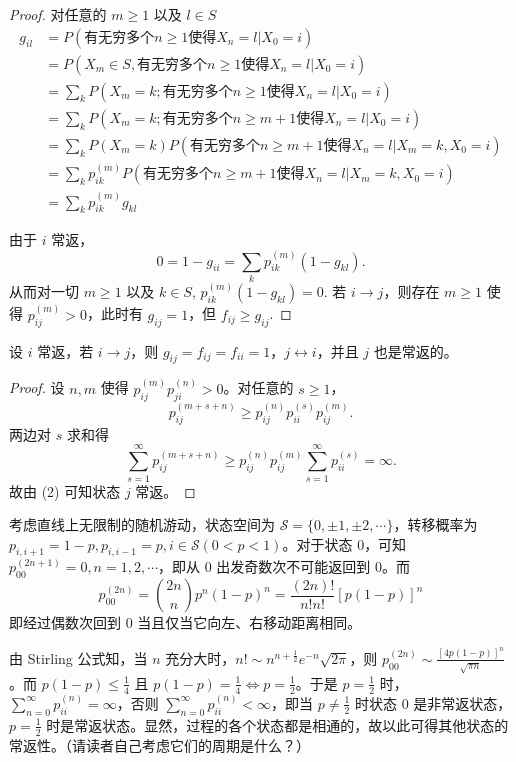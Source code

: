 \documentclass[lang=cn,10pt,thmcnt=section]{elegantbook}
\begin{document}
\begin{proof}
	对任意的 $m \geq 1$ 以及 $l \in S$
\begin{align*}
g_{il} &= P(\text{有无穷多个} n \geq 1 \text{使得} X_n = l | X_0 = i) \\
&= P(X_m \in S, \text{有无穷多个} n \geq 1 \text{使得} X_n = l | X_0 = i) \\
&= \sum_k P(X_m = k; \text{有无穷多个} n \geq 1 \text{使得} X_n = l | X_0 = i) \\
&= \sum_k P(X_m = k; \text{有无穷多个} n \geq m+1 \text{使得} X_n = l | X_0 = i) \\
&= \sum_k P(X_m = k) P(\text{有无穷多个} n \geq m+1 \text{使得} X_n = l | X_m = k, X_0 = i) \\
&= \sum_k p_{ik}^{(m)} P(\text{有无穷多个} n \geq m+1 \text{使得} X_n = l | X_m = k, X_0 = i) \\
&= \sum_k p_{ik}^{(m)} g_{kl}
\end{align*}

由于 $i$ 常返，
\[
0 = 1 - g_{ii} = \sum_k p_{ik}^{(m)} (1 - g_{kl}).
\]
从而对一切 $m \geq 1$ 以及 $k \in S$, $p_{ik}^{(m)} (1 - g_{kl}) = 0$.
若 $i \rightarrow j$，则存在 $m \geq 1$ 使得 $p_{ij}^{(m)} > 0$，此时有 $g_{ij} = 1$，但 $f_{ij} \geq g_{ij}$.

\end{proof}
\begin{theorem}
	设 $i$ 常返，若 $i \rightarrow j$，则 $g_{ij} = f_{ij} = f_{ii} = 1$，$j \leftrightarrow i$，并且 $j$ 也是常返的。
\end{theorem}
\begin{proof}
	设 $n, m$ 使得 $p_{ij}^{(m)} p_{ji}^{(n)} > 0$。对任意的 $s \geq 1$，
\[
p_{ij}^{(m+s+n)} \geq p_{ij}^{(n)} p_{ii}^{(s)} p_{ij}^{(m)}.
\]
两边对 $s$ 求和得
\[
\sum_{s=1}^{\infty} p_{ij}^{(m+s+n)} \geq p_{ij}^{(n)} p_{ij}^{(m)} \sum_{s=1}^{\infty} p_{ii}^{(s)} = \infty.
\]
故由 (2) 可知状态 $j$ 常返。
\end{proof}
\begin{example}
	考虑直线上无限制的随机游动，状态空间为 $\mathcal{S} = \{0, \pm 1, \pm 2, \cdots\}$，转移概率为 $p_{i,i+1} = 1 - p, p_{i,i-1} = p, i \in \mathcal{S} (0 < p < 1)$。对于状态 $0$，可知 $p_{00}^{(2n+1)} = 0, n = 1, 2, \cdots$，即从 $0$ 出发奇数次不可能返回到 $0$。而
\[
p_{00}^{(2n)} = \binom{2n}{n} p^n (1-p)^n = \frac{(2n)!}{n! n!} [p(1-p)]^n
\]
即经过偶数次回到 $0$ 当且仅当它向左、右移动距离相同。

由 Stirling 公式知，当 $n$ 充分大时，$n! \sim n^{n+\frac{1}{2}} e^{-n} \sqrt{2\pi}$，则 $p_{00}^{(2n)} \sim \frac{[4p(1-p)]^n}{\sqrt{\pi n}}$。而 $p(1-p) \leq \frac{1}{4}$ 且 $p(1-p) = \frac{1}{4} \iff p = \frac{1}{2}$。于是 $p = \frac{1}{2}$ 时，$\sum_{n=0}^{\infty} p_{ii}^{(n)} = \infty$，否则 $\sum_{n=0}^{\infty} p_{ii}^{(n)} < \infty$，即当 $p \neq \frac{1}{2}$ 时状态 $0$ 是非常返状态，$p = \frac{1}{2}$ 时是常返状态。显然，过程的各个状态都是相通的，故以此可得其他状态的常返性。（请读者自己考虑它们的周期是什么？）
\end{example}
\end{document}

